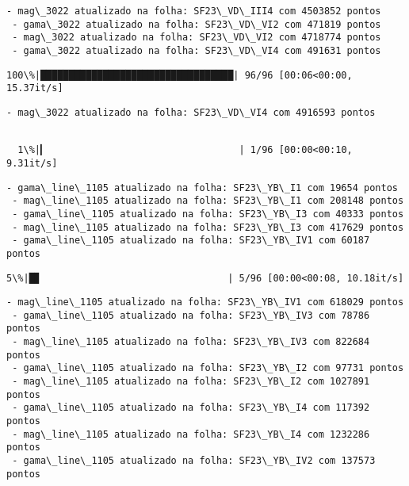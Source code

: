 \documentclass[11pt]{article}
\begin{document}
    \begin{Verbatim}[commandchars=\\\{\}]
 - mag\_3022 atualizado na folha: SF23\_VD\_III4 com 4503852 pontos
 - gama\_3022 atualizado na folha: SF23\_VD\_VI2 com 471819 pontos
 - mag\_3022 atualizado na folha: SF23\_VD\_VI2 com 4718774 pontos
 - gama\_3022 atualizado na folha: SF23\_VD\_VI4 com 491631 pontos
    \end{Verbatim}

    \begin{Verbatim}[commandchars=\\\{\}]
100\%|██████████████████████████████████| 96/96 [00:06<00:00, 15.37it/s]
    \end{Verbatim}

    \begin{Verbatim}[commandchars=\\\{\}]
 - mag\_3022 atualizado na folha: SF23\_VD\_VI4 com 4916593 pontos
    \end{Verbatim}

    \begin{Verbatim}[commandchars=\\\{\}]

  1\%|▎                                  | 1/96 [00:00<00:10,  9.31it/s]
    \end{Verbatim}

    \begin{Verbatim}[commandchars=\\\{\}]
 - gama\_line\_1105 atualizado na folha: SF23\_YB\_I1 com 19654 pontos
 - mag\_line\_1105 atualizado na folha: SF23\_YB\_I1 com 208148 pontos
 - gama\_line\_1105 atualizado na folha: SF23\_YB\_I3 com 40333 pontos
 - mag\_line\_1105 atualizado na folha: SF23\_YB\_I3 com 417629 pontos
 - gama\_line\_1105 atualizado na folha: SF23\_YB\_IV1 com 60187 pontos
    \end{Verbatim}

    \begin{Verbatim}[commandchars=\\\{\}]
  5\%|█▊                                 | 5/96 [00:00<00:08, 10.18it/s]
    \end{Verbatim}

    \begin{Verbatim}[commandchars=\\\{\}]
 - mag\_line\_1105 atualizado na folha: SF23\_YB\_IV1 com 618029 pontos
 - gama\_line\_1105 atualizado na folha: SF23\_YB\_IV3 com 78786 pontos
 - mag\_line\_1105 atualizado na folha: SF23\_YB\_IV3 com 822684 pontos
 - gama\_line\_1105 atualizado na folha: SF23\_YB\_I2 com 97731 pontos
 - mag\_line\_1105 atualizado na folha: SF23\_YB\_I2 com 1027891 pontos
 - gama\_line\_1105 atualizado na folha: SF23\_YB\_I4 com 117392 pontos
 - mag\_line\_1105 atualizado na folha: SF23\_YB\_I4 com 1232286 pontos
 - gama\_line\_1105 atualizado na folha: SF23\_YB\_IV2 com 137573 pontos
    \end{Verbatim}
\end{document}

